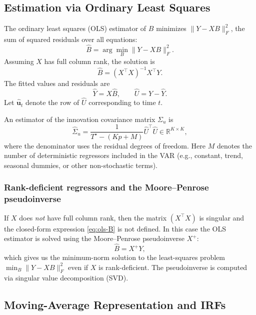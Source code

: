 \documentclass[11pt]{article}
\begin{document}
\subsection{Estimation via Ordinary Least Squares}
The ordinary least squares (OLS) estimator of $B$ minimizes
$\|Y - X B\|_F^2$, the sum of squared residuals over all equations:
\begin{equation}
  \widehat{B}
  = \arg\min_{B} \|Y - X B\|_F^2.
\end{equation}
Assuming $X$ has full column rank, the solution is
\begin{equation}
  \widehat{B}
  = (X^\top X)^{-1} X^\top Y.
  \label{eq:ols-B}
\end{equation}
The fitted values and residuals are
\begin{equation}
  \widehat{Y} = X \widehat{B},
  \qquad
  \widehat{U} = Y - \widehat{Y}.
\end{equation}
Let $\widehat{\mathbf{u}}_t$ denote the row of $\widehat{U}$ corresponding
to time $t$.

An estimator of the innovation covariance matrix $\Sigma_u$ is
\begin{equation}
  \widehat{\Sigma}_u
  = \frac{1}{T^\star - (Kp + M)}
    \widehat{U}^\top \widehat{U}
  \in \mathbb{R}^{K \times K},
  \label{eq:sigma_u_hat}
\end{equation}
where the denominator uses the residual degrees of freedom.  Here $M$
denotes the number of deterministic regressors included in the VAR
(e.g., constant, trend, seasonal dummies, or other non-stochastic terms).


\subsubsection*{Rank-deficient regressors and the Moore--Penrose pseudoinverse}

If $X$ does \emph{not} have full column rank, then the matrix
$(X^\top X)$ is singular and the closed-form expression
\eqref{eq:ols-B} is not defined.  In this case the OLS estimator is
solved using the Moore--Penrose pseudoinverse $X^{+}$:
\begin{equation}
  \widehat{B}
  = X^{+} Y,
\end{equation}
which gives us the minimum-norm solution to the least-squares problem
$\min_{B} \|Y - X B\|_F^2$ even if $X$ is rank-deficient.  The
pseudoinverse is computed via singular value
decomposition (SVD).

\subsection{Moving-Average Representation and IRFs}
\label{app:irf}
\end{document}
